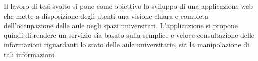 Il lavoro di tesi svolto si pone come obiettivo lo sviluppo di una applicazione web che mette a disposizione degli utenti una visione chiara e completa dell'occupazione delle aule negli spazi universitari. L'applicazione si propone quindi di rendere un servizio sia basato sulla semplice e veloce consultazione delle informazioni riguardanti lo stato delle aule universitarie, sia la manipolazione di tali informazioni.
